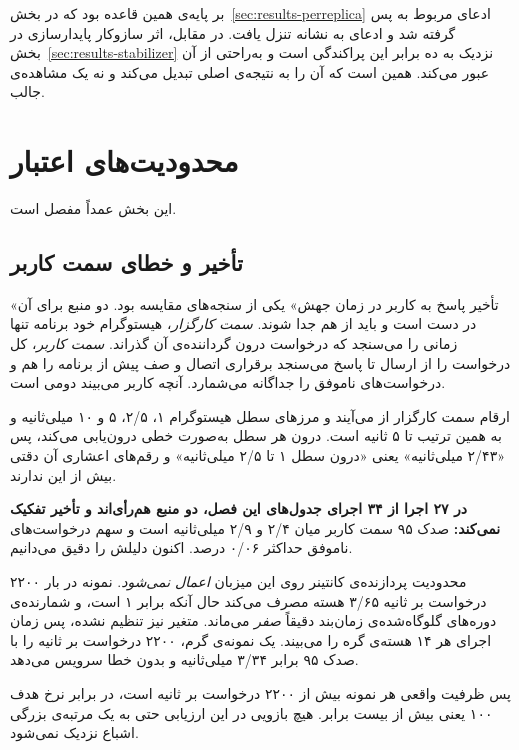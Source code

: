 بر پایه‌ی همین قاعده بود که در بخش~\ref{sec:results-perreplica} ادعای مربوط به 
پس گرفته شد و ادعای  به نشانه تنزل یافت. در مقابل، اثر سازوکار پایدارسازی در
بخش~\ref{sec:results-stabilizer} نزدیک به ده برابر این پراکندگی است و به‌راحتی از آن عبور
می‌کند. همین است که آن را به نتیجه‌ی اصلی تبدیل می‌کند و نه یک مشاهده‌ی جالب.

\section{محدودیت‌های اعتبار}
\label{sec:results-validity}

این بخش عمداً مفصل است.

\subsection{تأخیر و خطای سمت کاربر}
\label{sec:results-latency}

«تأخیر پاسخ به کاربر در زمان جهش» یکی از سنجه‌های مقایسه بود. دو منبع برای آن در دست است و
باید از هم جدا شوند. \emph{سمت کارگزار}، هیستوگرام خود برنامه تنها زمانی را می‌سنجد که درخواست
درون گرداننده‌ی آن گذراند. \emph{سمت کاربر}،  کل درخواست را از ارسال تا پاسخ می‌سنجد
\mdash{} برقراری اتصال و صف پیش از برنامه را هم \mdash{} و درخواست‌های ناموفق را جداگانه می‌شمارد.
آنچه کاربر می‌بیند دومی است.

ارقام سمت کارگزار از  می‌آیند و مرزهای سطل هیستوگرام ۱، ۲/۵، ۵ و ۱۰
میلی‌ثانیه و به همین ترتیب تا ۵ ثانیه است.  درون هر سطل به‌صورت خطی درون‌یابی
می‌کند، پس «۲/۴۳ میلی‌ثانیه» یعنی «درون سطل ۱ تا ۲/۵ میلی‌ثانیه» و رقم‌های اعشاری آن دقتی بیش
از این ندارند.

\textbf{در ۲۷ اجرا از ۳۴ اجرای جدول‌های این فصل، دو منبع هم‌رأی‌اند و تأخیر تفکیک نمی‌کند:}
صدک ۹۵ سمت کاربر میان ۲/۴ و ۲/۹ میلی‌ثانیه است و سهم درخواست‌های ناموفق حداکثر ۰/۰۶ درصد.
اکنون دلیلش را دقیق می‌دانیم.

محدودیت پردازنده‌ی کانتینر روی این میزبان \emph{اعمال نمی‌شود}. نمونه در بار ۲۲۰۰ درخواست بر
ثانیه ۳/۶۵ هسته مصرف می‌کند حال آنکه  برابر ۱ است، و شمارنده‌ی دوره‌های
گلوگاه‌شده‌ی زمان‌بند دقیقاً \emph{صفر} می‌ماند. متغیر  نیز تنظیم نشده، پس
زمان اجرای  هر ۱۴ هسته‌ی گره را می‌بیند. یک نمونه‌ی گرم، ۲۲۰۰ درخواست بر ثانیه را با
صدک ۹۵ برابر ۳/۳۴ میلی‌ثانیه و بدون خطا سرویس می‌دهد.

پس ظرفیت واقعی هر نمونه بیش از ۲۲۰۰ درخواست بر ثانیه است، در برابر نرخ هدف ۱۰۰ \mdash{} یعنی بیش از
بیست برابر. هیچ بازویی در این ارزیابی حتی به یک مرتبه‌ی بزرگی اشباع نزدیک نمی‌شود.

